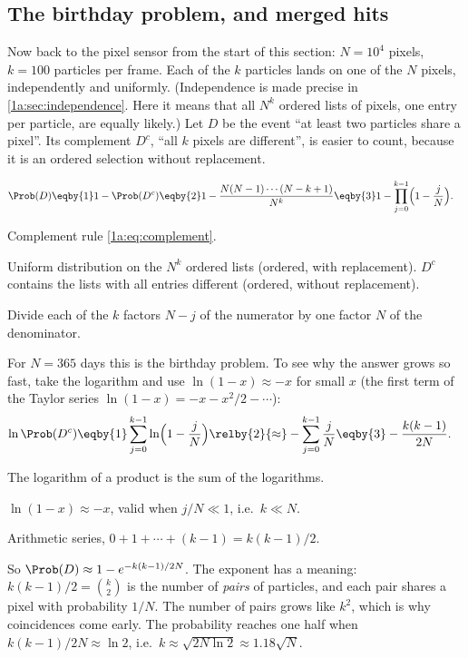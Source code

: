 \subsection{The birthday problem, and merged hits}

Now back to the pixel sensor from the start of this section: $N=10^4$ pixels,
$k=100$ particles per frame. Each of the $k$ particles lands on one of the $N$
pixels, independently and uniformly. (Independence is made precise in
\cref{1a:sec:independence}. Here it means that all $N^k$ ordered lists of
pixels, one entry per particle, are equally likely.) Let $D$ be the event ``at
least two particles share a pixel''. Its complement $D^c$, ``all $k$ pixels are
different'', is easier to count, because it is an ordered selection without
replacement.

\begin{align}
\Prob(D)
&\eqby{1} 1-\Prob(D^c)
 \eqby{2} 1-\frac{N(N-1)\cdots(N-k+1)}{N^k}
 \eqby{3} 1-\prod_{j=0}^{k-1}\Bigl(1-\frac jN\Bigr).
\label{1a:eq:bday-exact}
\end{align}
\begin{explain}
  \item Complement rule \eqref{1a:eq:complement}.
  \item Uniform distribution on the $N^k$ ordered lists (ordered, with
        replacement). $D^c$ contains the lists with all entries different
        (ordered, without replacement).
  \item Divide each of the $k$ factors $N-j$ of the numerator by one factor $N$
        of the denominator.
\end{explain}
For $N=365$ days this is the birthday problem. To see why the answer grows so
fast, take the logarithm and use $\ln(1-x)\approx-x$ for small $x$ (the first
term of the Taylor series $\ln(1-x)=-x-x^2/2-\cdots$):
\begin{align}
\ln\Prob(D^c)
&\eqby{1}\sum_{j=0}^{k-1}\ln\Bigl(1-\frac jN\Bigr)
 \relby{2}{\approx}-\sum_{j=0}^{k-1}\frac jN
 \eqby{3}-\frac{k(k-1)}{2N}.
\label{1a:eq:bday-approx}
\end{align}
\begin{explain}
  \item The logarithm of a product is the sum of the logarithms.
  \item $\ln(1-x)\approx-x$, valid when $j/N\ll1$, i.e.\ $k\ll N$.
  \item Arithmetic series, $0+1+\cdots+(k-1)=k(k-1)/2$.
\end{explain}
So $\Prob(D)\approx1-e^{-k(k-1)/2N}$. The exponent has a meaning: $k(k-1)/2=\binom k2$ is
the number of \emph{pairs} of particles, and each pair shares a pixel with
probability $1/N$. The number of pairs grows like $k^2$, which is why
coincidences come early. The probability reaches one half when
$k(k-1)/2N\approx\ln2$, i.e.\ $k\approx\sqrt{2N\ln2}\approx1.18\sqrt N$.

